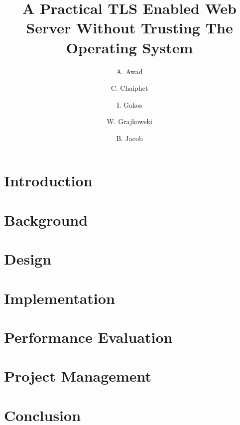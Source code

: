 \documentclass{article}
\title{A Practical TLS Enabled Web Server Without Trusting The Operating
System}
\author{
  A. Awad \and
  C. Chaiphet \and
  I. Gakos \and
  W. Grajkowski \and
  B. Jacob
}
\begin{document}
\maketitle
{}
\newpage

\begin{abstract}
  
\end{abstract}
\newpage

\tableofcontents
\newpage


\section{Introduction}

\newpage

\section{Background}
\label{sec:background}

\newpage

\section{Design}
\label{sec:design}

\newpage

\section{Implementation}
\label{sec:implementation}
 
\newpage

\section{Performance Evaluation}
\label{sec:perfeval}

\newpage

\section{Project Management}
\label{sec:projectmgmt}

\newpage

\section{Conclusion}
\label{sec:conclusion}

\newpage

\printbibliography
\end{document}
